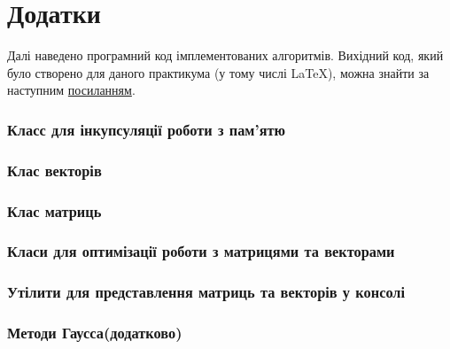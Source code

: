 \section*{\centering Додатки}



Далі наведено програмний код імплементованих алгоритмів.
Вихідний код, який було створено для даного практикума
(у тому числі \LaTeX),
можна знайти за наступним
\href{https://github.com/ShkalikovOleh/Programming-Labs}{посиланням}.

\subsubsection*{Класс для інкупсуляції роботи з пам'ятю}


\subsubsection*{Клас векторів}


\subsubsection*{Клас матриць}


\subsubsection*{Класи для оптимізації роботи з матрицями та векторами}


\subsubsection*{Утілити для представлення матриць та векторів у консолі}


\subsubsection*{Методи Гаусса(додатково)}


